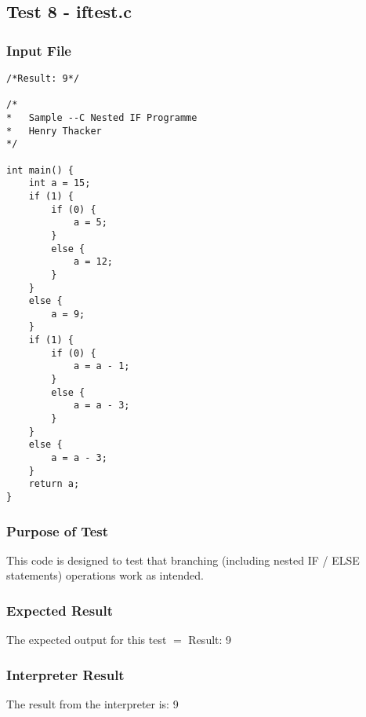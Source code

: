 \subsection{Test 8 - iftest.c}
\subsubsection{Input File}
\begin{lstlisting}[showstringspaces=false,breaklines=true,backgroundcolor=\color{light-gray}, captionpos=b]
/*Result: 9*/

/*
*	Sample --C Nested IF Programme
*	Henry Thacker
*/

int main() {
	int a = 15;
	if (1) {
		if (0) {
			a = 5;
		}
		else {
			a = 12;
		}
	}
	else {
		a = 9;
	}
	if (1) {
		if (0) {
			a = a - 1;
		}
		else {
			a = a - 3;
		}
	}
	else {
		a = a - 3;
	}
	return a;
}
\end{lstlisting}\subsubsection{Purpose of Test}
This code is designed to test that branching (including nested IF / ELSE statements) operations work as intended.

\subsubsection{Expected Result}
The expected output for this test $=$ Result: 9
\subsubsection{Interpreter Result}
The result from the interpreter is: 9
